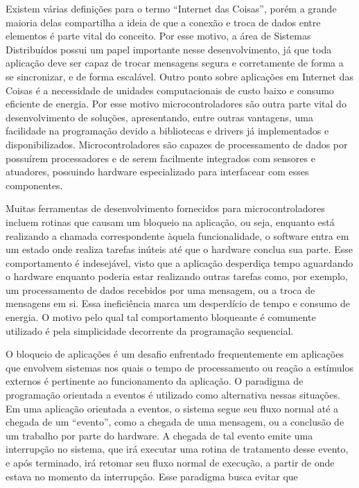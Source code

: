 \documentclass[11pt]{article}
\begin{document}
\tab Existem várias definições para o termo “Internet das
Coisas”, porém a grande maioria delas compartilha a ideia de que a conexão e troca de dados
entre elementos é parte vital do conceito. Por esse motivo, a área de Sistemas Distribuídos possui um
papel importante nesse desenvolvimento, já que toda aplicação deve ser capaz de trocar
mensagens segura e corretamente de forma a se sincronizar, e de forma escalável.\cite{singh2014}\cite{wortmann2015}\cite{chui2010}
Outro ponto sobre aplicações em Internet das Coisas é a necessidade de unidades
computacionais de custo baixo e consumo eficiente de energia. Por esse motivo microcontroladores
são outra parte vital do desenvolvimento de soluções, apresentando, entre outras vantagens, uma
facilidade na programação devido a bibliotecas e drivers já implementados e disponibilizados.
Microcontroladores são capazes de processamento de dados por possuírem processadores e de
serem facilmente integrados com sensores e atuadores, possuindo hardware especializado para
interfacear com esses componentes.\cite{edwards1997}
\par Muitas ferramentas de desenvolvimento fornecidos para microcontroladores incluem rotinas que causam um bloqueio na
aplicação, ou seja, enquanto está realizando a chamada correspondente àquela funcionalidade, o
software entra em um estado onde realiza tarefas inúteis até que o hardware conclua sua
parte. Esse comportamento é indesejável, visto que a aplicação desperdiça tempo aguardando o
hardware enquanto poderia estar realizando outras tarefas como, por exemplo, um processamento de
dados recebidos por uma mensagem, ou a troca de mensagens em si. Essa ineficiência marca um
desperdício de tempo e consumo de energia. O motivo pelo qual tal comportamento bloqueante é comumente utilizado é pela simplicidade decorrente da programação sequencial.
\par O bloqueio de aplicações é um desafio enfrentado frequentemente em aplicações que envolvem
sistemas nos quais o tempo de processamento ou reação a estímulos externos é pertinente ao
funcionamento da aplicação. O paradigma de programação orientada a eventos é utilizado como alternativa nessas situações. Em uma aplicação orientada a eventos, o sistema segue
seu fluxo normal até a chegada de um “evento”, como a chegada de uma mensagem, ou a conclusão
de um trabalho por parte do hardware. A chegada de tal evento emite uma interrupção no sistema, que
irá executar uma rotina de tratamento desse evento, e após terminado, irá retomar seu fluxo normal
de execução, a partir de onde estava no momento da interrupção. Esse paradigma busca evitar que
\end{document}
